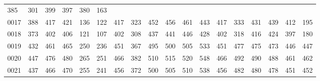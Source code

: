 \begin{table}[htbp]
\begin{center}
{\begin{tabular}{lccccccccccccccccc}
						   385 & 301 & 399 & 397
							       & 380 &
								       163 \\
0017 & 388 & 417 & 421 & 136 & 122 & 417 & 323 & 452 & 456 & 461 & 443 &
						   417 & 333 & 431 & 439
							       & 412 &
								       195 \\
0018 & 373 & 402 & 406 & 121 & 107 & 402 & 308 & 437 & 441 & 446 & 428 &
						   402 & 318 & 416 & 424
							       & 397 &
								       180 \\
0019 & 432 & 461 & 465 & 250 & 236 & 451 & 367 & 495 & 500 & 505 & 533 &
						   451 & 477 & 475 & 473
							       & 446 &
								       447 \\
0020 & 447 & 476 & 480 & 265 & 251 & 466 & 382 & 510 & 515 & 520 & 548 &
						   466 & 492 & 490 & 488
							       & 461 &
								       462 \\
0021 & 437 & 466 & 470 & 255 & 241 & 456 & 372 & 500 & 505 & 510 & 538 &
						   456 & 482 & 480 & 478
							       & 451 &
								       452 \\
\hline
%
  \end{tabular}
  }
 \end{center}
\end{table}

